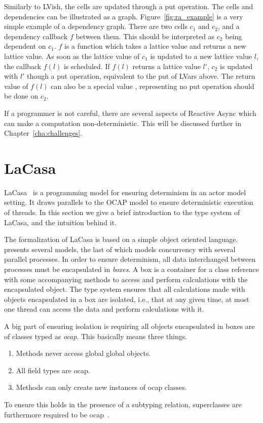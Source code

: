 Similarly to LVish, the cells are updated through a put operation.  The cells and
dependencies can be illustrated as a graph.  Figure~\ref{fig:ra_example} is a
very simple example of a dependency graph.  There are two cells $c_1$ and $c_2$,
and a dependency callback $f$ between them. This should be interpreted as $c_2$
being dependent on $c_1$.  $f$ is a function which takes a lattice value and
returns a new lattice value.  As soon as the lattice value of
$c_1$ is updated to a new lattice value $l$, the callback $f(l)$ is scheduled. If $f(l)$
returns a lattice value $l'$, $c_2$ is updated with $l'$ though a put operation,
equivalent to the put of LVars above.
The return value of $f(l)$ can also be a special value ,
representing no put operation should be done on $c_2$.

If a programmer is not careful, there are several aspects of Reactive Async
which can make a computation non-deterministic. This will be discussed further 
in Chapter~\ref{cha:challenges}. 



\section{LaCasa}\label{sec:lacasa}

LaCasa~\parencite{conf/oopsla/HallerL16} is a programming model for ensuring
determinism in an actor model~\parencite{Hewi73a} setting. It draws
parallels to the OCAP model to ensure deterministic execution of threads. In
this section we give a brief introduction to the type system of LaCasa, and the
intuition behind it.

The formalization of LaCasa is based on a simple object oriented language.
\textcite{conf/oopsla/HallerL16} presents several models, the last of which
models concurrency with several parallel processes. In order to ensure
determinism, all data interchanged between processes must be encapsulated in
\emph{boxes}. A box is a container for a class reference with some accompanying
methods to access and perform calculations with the encapsulated object. The
type system ensures that all calculations made with objects encapsulated in a box
are isolated, i.e., that at any given time, at most one thread can access the
data and perform calculations with it.

A big part of ensuring isolation is requiring all objects encapsulated in boxes
are of classes typed as \emph{ocap}. This basically means three things.
\begin{enumerate}
  \item Methods never access global global objects.
  \item All field types are ocap.
  \item Methods can only create new instances of ocap classes.
\end{enumerate}
To ensure this holds in the presence of a subtyping relation, superclasses are
furthermore required to be ocap~\parencite{conf/oopsla/HallerL16}.

